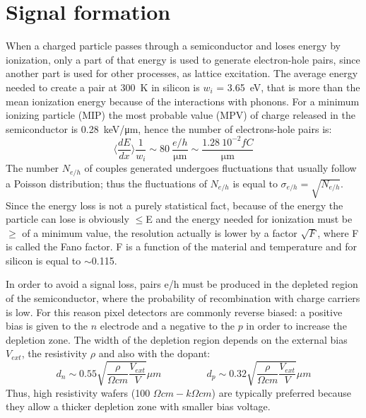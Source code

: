 \section{Signal formation}
   When a charged particle passes through a semiconductor and loses energy by ionization, only a part of that energy is used to generate electron-hole pairs, since another part is used for other processes, as lattice excitation.
   The average energy needed to create a pair at \SI{300}{K} in silicon is $w_i$ = \SI{3.65}{eV}, that is more than the mean ionization energy because of the interactions with phonons. For a minimum ionizing particle (MIP) the most probable value (MPV) of charge released in the semiconductor is \SI{0.28}{keV/\um}, hence the number of electrons-hole pairs is: 
   \begin{equation}\label{eq:charge_MIP}
       \langle \frac{dE}{dx}\rangle \frac{1}{w_i} \sim 80 \: \frac{e/h}{\si{\um}} \sim \frac{1.28 \:10^{-2}\si{fC}}{\si{\um}}
   \end{equation}
   The number $N_{e/h}$ of couples generated undergoes fluctuations that usually follow a Poisson distribution;
   thus the fluctuations of $N_{e/h}$ is equal to  $\sigma_{e/h} =\sqrt{N_{e/h}}$. Since the energy loss is not a purely statistical fact, because of the energy the particle can lose is obviously $\leqslant$E and the energy needed for ionization must be $\geqslant$ of a minimum value, the resolution actually is lower by a factor $\sqrt{F}$, where F is called the Fano factor. F is a function of the material and temperature and for silicon is equal to $\sim$0.115.

   In order to avoid a signal loss, pairs e/h must be produced in the depleted region of the semiconductor, where the probability of recombination with charge carriers is low.
   For this reason pixel detectors are commonly reverse biased: a positive bias is given to the $n$ electrode and a negative to the $p$ in order to increase the depletion zone. 
   The width of the depletion region depends on the external bias $V_{ext}$, the resistivity $\rho$ and also with the dopant:
   \begin{equation}
      d_{n} \sim 0.55 \sqrt{\frac{\rho}{\Omega cm}\frac{V_{ext}}{V}} \mu m 
      \hspace{55pt}
      d_{p} \sim 0.32 \sqrt{\frac{\rho}{\Omega cm}\frac{V_{ext}}{V}} \mu m
      \label{eq:deplation_d}
   \end{equation}
   Thus, high resistivity wafers (100 $\Omega cm - k\Omega cm$) are typically preferred because they allow a thicker depletion zone with smaller bias voltage. 

